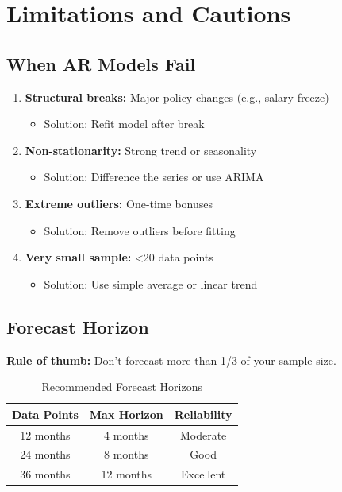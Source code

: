 \section{Limitations and Cautions}

\subsection{When AR Models Fail}

\begin{enumerate}
    \item \textbf{Structural breaks:} Major policy changes (e.g., salary freeze)
    \begin{itemize}
        \item Solution: Refit model after break
    \end{itemize}
    
    \item \textbf{Non-stationarity:} Strong trend or seasonality
    \begin{itemize}
        \item Solution: Difference the series or use ARIMA
    \end{itemize}
    
    \item \textbf{Extreme outliers:} One-time bonuses
    \begin{itemize}
        \item Solution: Remove outliers before fitting
    \end{itemize}
    
    \item \textbf{Very small sample:} <20 data points
    \begin{itemize}
        \item Solution: Use simple average or linear trend
    \end{itemize}
\end{enumerate}

\subsection{Forecast Horizon}

\textbf{Rule of thumb:} Don't forecast more than 1/3 of your sample size.

\begin{table}[H]
\centering
\begin{tabular}{ccc}
\toprule
\textbf{Data Points} & \textbf{Max Horizon} & \textbf{Reliability} \\
\midrule
12 months & 4 months & Moderate \\
24 months & 8 months & Good \\
36 months & 12 months & Excellent \\
\bottomrule
\end{tabular}
\caption{Recommended Forecast Horizons}
\end{table}

